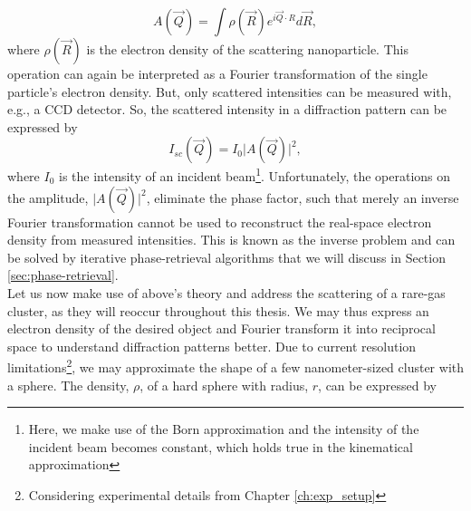 \begin{equation}
A(\vec{Q})=\int \rho\left(\vec{R}\right) e^{i \vec{Q}\cdot R}d\vec{R},
\label{eq:scattered-amplitude}
\end{equation}
where $\rho\left(\vec{R}\right)$ is the electron density of the scattering nanoparticle. This operation can again be interpreted as a Fourier transformation of the single particle’s electron density. But, only scattered intensities can be measured with, e.g., a CCD detector. So, the scattered intensity in a diffraction pattern can be expressed by
\begin{equation}
I_{sc}\left(\vec{Q}\right)=I_{0}\lvert A(\vec{Q})\rvert^{2},
\label{eq:scattered-intensity}
\end{equation}
where $I_{0}$ is the intensity of an incident beam\footnote{Here, we make use of the Born approximation and the intensity of the incident beam becomes constant, which holds true in the kinematical approximation}. Unfortunately, the operations on the amplitude, $\lvert A(\vec{Q})\rvert^{2}$, eliminate the phase factor, such that merely an inverse Fourier transformation cannot be used to reconstruct the real-space electron density from measured intensities. This is known as the inverse problem and can be solved by iterative phase-retrieval algorithms that we will discuss in Section \ref{sec:phase-retrieval}.\\[1\baselineskip]
%
Let us now make use of above's theory and address the scattering of a rare-gas cluster, as they will reoccur throughout this thesis. We may thus express an electron density of the desired object and Fourier transform it into reciprocal space to understand diffraction patterns better. Due to current resolution limitations\footnote{Considering experimental details from Chapter \ref{ch:exp_setup}}, we may approximate the shape of a few nanometer-sized cluster with a sphere. The density, $\rho$, of a hard sphere with radius, $r$, can be expressed by 
